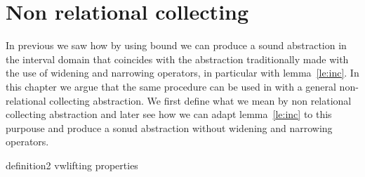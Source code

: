 \section{Non relational collecting}
\label{sec:nonrelational}

In previous we saw how by using bound we can produce a sound
abstraction in the interval domain that coincides with the abstraction
traditionally made with the use of widening and narrowing operators,
in particular with lemma~\ref{le:inc}. In this chapter we argue that
the same procedure can be used in with a general non-relational
collecting abstraction. We first define what we mean by non relational
collecting abstraction and later see how we can adapt
lemma~\ref{le:inc} to this purpouse and produce a sonud abstraction
without widening and narrowing operators.

{definition2}
{vwlifting}
{properties}
